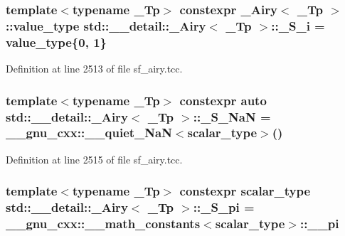 \subsubsection[{\texorpdfstring{\+\_\+\+S\+\_\+i}{_S_i}}]{\setlength{\rightskip}{0pt plus 5cm}template$<$typename \+\_\+\+Tp$>$ constexpr {\bf \+\_\+\+Airy}$<$ \+\_\+\+Tp $>$\+::{\bf value\+\_\+type} {\bf std\+::\+\_\+\+\_\+detail\+::\+\_\+\+Airy}$<$ \+\_\+\+Tp $>$\+::\+\_\+\+S\+\_\+i = {\bf value\+\_\+type}\{0, 1\}\hspace{0.3cm}{\ttfamily [static]}}\hypertarget{classstd_1_1____detail_1_1__Airy_ae5cbd31a89afec0cfb04cc51c1192c5b}{}\label{classstd_1_1____detail_1_1__Airy_ae5cbd31a89afec0cfb04cc51c1192c5b}


Definition at line 2513 of file sf\+\_\+airy.\+tcc.

\subsubsection[{\texorpdfstring{\+\_\+\+S\+\_\+\+NaN}{_S_NaN}}]{\setlength{\rightskip}{0pt plus 5cm}template$<$typename \+\_\+\+Tp$>$ constexpr auto {\bf std\+::\+\_\+\+\_\+detail\+::\+\_\+\+Airy}$<$ \+\_\+\+Tp $>$\+::\+\_\+\+S\+\_\+\+NaN = \+\_\+\+\_\+gnu\+\_\+cxx\+::\+\_\+\+\_\+quiet\+\_\+\+NaN$<${\bf scalar\+\_\+type}$>$()\hspace{0.3cm}{\ttfamily [static]}}\hypertarget{classstd_1_1____detail_1_1__Airy_a906b2ddeac8ea00ed389d8ba0a4ebcc7}{}\label{classstd_1_1____detail_1_1__Airy_a906b2ddeac8ea00ed389d8ba0a4ebcc7}


Definition at line 2515 of file sf\+\_\+airy.\+tcc.

\subsubsection[{\texorpdfstring{\+\_\+\+S\+\_\+pi}{_S_pi}}]{\setlength{\rightskip}{0pt plus 5cm}template$<$typename \+\_\+\+Tp$>$ constexpr {\bf scalar\+\_\+type} {\bf std\+::\+\_\+\+\_\+detail\+::\+\_\+\+Airy}$<$ \+\_\+\+Tp $>$\+::\+\_\+\+S\+\_\+pi = \+\_\+\+\_\+gnu\+\_\+cxx\+::\+\_\+\+\_\+math\+\_\+constants$<${\bf scalar\+\_\+type}$>$\+::\+\_\+\+\_\+pi\hspace{0.3cm}{\ttfamily [static]}}\hypertarget{classstd_1_1____detail_1_1__Airy_a299a1c3b18fed38b2d35956650c888ed}{}\label{classstd_1_1____detail_1_1__Airy_a299a1c3b18fed38b2d35956650c888ed}


